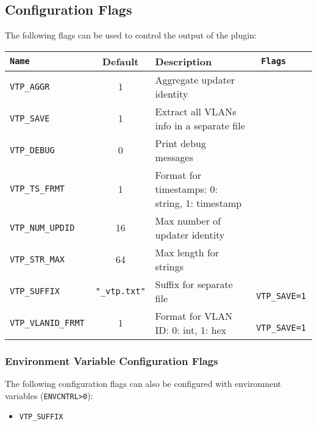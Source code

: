 \documentclass[documentation]{subfiles}
\begin{document}
\subsection{Configuration Flags}
The following flags can be used to control the output of the plugin:
\begin{longtable}{>{\tt}lcl>{\tt\small}l}
    \toprule
    {\bf Name}        & {\bf Default}           & {\bf Description}                              & {\bf Flags}\\
    \midrule\endhead%
    VTP\_AGGR         & 1                       & Aggregate updater identity                     & \\
    VTP\_SAVE         & 1                       & Extract all VLANs info in a separate file      & \\
    VTP\_DEBUG        & 0                       & Print debug messages                           & \\
    VTP\_TS\_FRMT     & 1                       & Format for timestamps: 0: string, 1: timestamp & \\
    VTP\_NUM\_UPDID   & 16                      & Max number of updater identity                 & \\
    VTP\_STR\_MAX     & 64                      & Max length for strings                         & \\
    VTP\_SUFFIX       & {\tt\small "\_vtp.txt"} & Suffix for separate file                       & VTP\_SAVE=1\\
    VTP\_VLANID\_FRMT & 1                       & Format for VLAN ID: 0: int, 1: hex             & VTP\_SAVE=1\\
    \bottomrule
\end{longtable}

\subsubsection{Environment Variable Configuration Flags}
The following configuration flags can also be configured with environment variables ({\tt ENVCNTRL>0}):
\begin{itemize}
    \item {\tt VTP\_SUFFIX}
\end{itemize}
\end{document}

